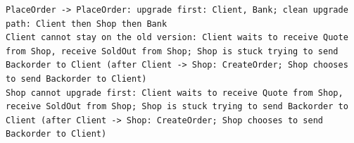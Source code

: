 \begin{lstlisting}[language={},basicstyle=\ttfamily\footnotesize,breaklines=true]
PlaceOrder -> PlaceOrder: upgrade first: Client, Bank; clean upgrade path: Client then Shop then Bank
Client cannot stay on the old version: Client waits to receive Quote from Shop, receive SoldOut from Shop; Shop is stuck trying to send Backorder to Client (after Client -> Shop: CreateOrder; Shop chooses to send Backorder to Client)
Shop cannot upgrade first: Client waits to receive Quote from Shop, receive SoldOut from Shop; Shop is stuck trying to send Backorder to Client (after Client -> Shop: CreateOrder; Shop chooses to send Backorder to Client)
\end{lstlisting}
